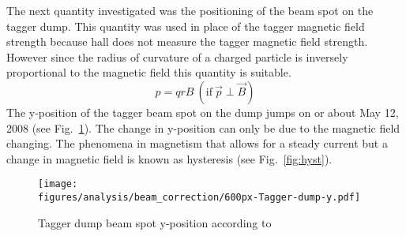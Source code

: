   The next quantity investigated was the positioning of the beam spot on the tagger dump. This quantity was used in place of the tagger magnetic field strength because hall  does not measure the tagger magnetic field strength. However since the radius of curvature of a charged particle is inversely proportional to the magnetic field this quantity is suitable.
  \begin{equation}\label{eq:motioninmagII}
  p = qrB \ (\mathrm{if}\ \vec{p} \perp \vec{B} )
  \end{equation}
  The y-position of the tagger beam spot on the dump jumps on or about May 12, 2008 (see Fig.~\ref{fig:tagdump}). The change in y-position can only be due to the magnetic field changing. The phenomena in magnetism that allows for a steady current but a change in magnetic field is known as hysteresis (see Fig.~\ref{fig:hyst}).
    \begin{figure}[h!]\begin{center}
  \texttt{[image: \\figures/analysis/beam\_correction/600px-Tagger-dump-y.pdf]}
  \caption[Tagger dump beam spot y-position according to ]{\label{fig:tagdump}Tagger dump beam spot y-position according to }
  \end{center}\end{figure}
  
